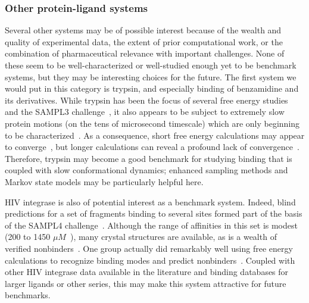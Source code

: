 \documentclass[aps,pre,twocolumn,nofootinbib,superscriptaddress,10pt, final,tightenlines]{revtex4-1}
\begin{document}
\subsubsection{Other protein-ligand systems}
Several other systems may be of possible interest because of the wealth and quality of experimental data, the extent of prior computational work, or the combination of pharmaceutical relevance with important challenges. 
None of these seem to be well-characterized or well-studied enough yet to be benchmark systems, but they may be interesting choices for the future. 
The first system we would put in this category is trypsin, and especially binding of benzamidine and its derivatives. 
While trypsin has been the focus of several free energy studies~\cite{talhout_understanding_2003, villa_sampling_2003, jiao_calculation_2008, jiao_trypsin_2009, de_ruiter_efficient_2012} and the SAMPL3 challenge~\cite{Newman:2011:JComputAidedMolDes, skillman_sampl3_2012}, it also appears to be subject to extremely slow protein motions (on the tens of microsecond timescale) which are only beginning to be characterized~\cite{plattner_protein_2015}.
As a consequence, short free energy calculations may appear to converge~\cite{talhout_understanding_2003, jiao_calculation_2008, jiao_trypsin_2009}, but longer calculations can reveal a profound lack of convergence~\cite{plattner_protein_2015}. 
Therefore, trypsin may become a good benchmark for studying binding that is coupled with slow conformational dynamics; enhanced sampling methods and
Markov state models \cite{plattner_protein_2015} may be particularly helpful here.

HIV integrase is also of potential interest as a benchmark system. 
Indeed, blind predictions for a set of fragments binding to several sites formed part of the basis of the SAMPL4 challenge~\cite{mobley_blind_2014, peat_interrogating_2014}. 
Although the range of affinities in this set is modest (200 to 1450 $\mu M$~\cite{peat_interrogating_2014}), many crystal structures are available, as is a wealth of verified nonbinders~\cite{peat_interrogating_2014}. 
One group actually did remarkably well using free energy calculations to recognize binding modes and predict nonbinders~\cite{gallicchio_virtual_2014, mobley_blind_2014}. 
Coupled with other HIV integrase data available in the literature and binding databases for larger ligands or other series, this may make this system attractive for future benchmarks.
\end{document}
